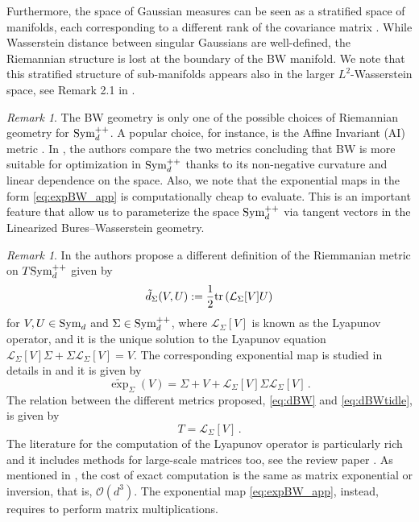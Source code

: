 \documentclass{article}
\theoremstyle{plain}
\theoremstyle{definition}
\theoremstyle{remark}
\newtheorem{remark}[theorem]{Remark}
\newcommand{\sym}{\textup{Sym}_d}
\newcommand{\pd}{\textup{Sym}^{++}_d}
\newcommand{\tr}{\textup{tr}}
\begin{document}
Furthermore, the space of Gaussian measures can be seen as a stratified space of manifolds, each corresponding to a different rank of the covariance matrix \cite{yann2023different}. While Wasserstein distance between singular Gaussians are well-defined, the Riemannian structure is lost at the boundary of the BW manifold.
We note that this stratified structure of sub-manifolds appears also in the larger $L^2$-Wasserstein space, see Remark 2.1 in \cite{ren2024ou}. 


\begin{remark}
The BW geometry is only one of the possible choices of Riemannian geometry for $\pd$. A popular choice, for instance, is the Affine Invariant (AI) metric \cite{pennec2006ai}. In \cite{han2021on}, the authors compare the two metrics concluding that BW is more suitable  for optimization in $\pd$ thanks to its non-negative curvature and linear dependence on the space. Also, we note that the exponential maps in the form \eqref{eq:expBW_app} is computationally cheap to evaluate. This is an important feature that allow us to parameterize the space $\pd$ via tangent vectors in the Linearized Bures--Wasserstein geometry.
\end{remark}


\begin{remark}
\label{rmk:riemann}
In  \cite{Malago2018,bathia2019} the authors propose a different definition of the Riemmanian metric on $T\pd$ given by
\begin{equation}
\label{eq:dBWtidle}
\tilde d_\Sigma(V,U):= \frac12 \tr\left( \mathcal{L}_\Sigma[V] U \right)
\end{equation}
for  $V,U\in \sym$ and $\Sigma\in\pd$, where $ \mathcal{L}_{\Sigma}[V]$ is known as the Lyapunov operator, and it is the unique solution to the Lyapunov equation
$ \mathcal{L}_{\Sigma}[V] \Sigma + \Sigma  \mathcal{L}_{\Sigma}[V] = V$.
The corresponding exponential map is studied in details in \cite{yann2023different} and it is given by
\begin{equation*} 
   \widetilde{\exp}_{\Sigma}(V)  = \Sigma + V + \mathcal{L}_{\Sigma}[V] \Sigma  \mathcal{L}_{\Sigma}[V]\,.
\end{equation*}
The relation between the different metrics proposed, \eqref{eq:dBW} and \eqref{eq:dBWtidle}, is given by 
\begin{equation*}
T = \mathcal{L}_{\Sigma}[V]\,.
\end{equation*}
The literature for the computation of the Lyapunov operator is particularly rich and it includes methods for large-scale matrices too, see the review paper \cite{simoncini2016}. As mentioned in \cite{han2021on}, the cost of exact computation is the same as matrix exponential or inversion, that is, $\mathcal{O}(d^3)$. The exponential map \eqref{eq:expBW_app}, instead, requires to perform matrix multiplications. 

\end{remark}
\end{document}
